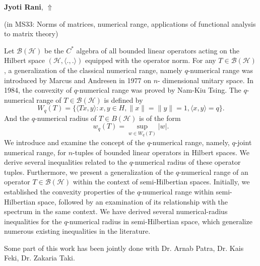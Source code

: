 \documentclass[ILAS2025-program.tex]{subfiles}
\begin{document}
\hypertarget{down0278}{}\begin{ilasabstract}
    
\textbf{Jyoti Rani},  \hfill \hyperlink{up0278}{$\Uparrow$}
    
    
(in {\color{mstitle}MS33: Norms of matrices, numerical range, applications of functional analysis to matrix theory})
        
\mtskip
    Let $\mathcal{B(H)}$ be the $C^*$ algebra of all bounded linear operators acting on the Hilbert space $(\mathcal{H}, \langle .,. \rangle )$ equipped with the operator norm. For any $T \in \mathcal{B(H)}$, 
a generalization of the classical numerical range, namely $q$-numerical range was introduced by Marcus and Andresen in 1977 on $n$- dimensional unitary space. In 1984, the convexity of $q$-numerical range was proved by Nam-Kiu Tsing. The $q$-numerical range of $T \in \mathcal{B}(\mathcal{H})$ is defined by 
\[
W_q(T)=\{ \langle Tx,y \rangle: x,y \in H, \|x\|=\|y\|=1, \langle x,y \rangle=q \}.
\]
		And the $q$-numerical radius of $T \in B(\mathcal{H})$ is of the form
\[
			w_q(T)=\sup_{w \in W_q(T)}|w|.
\]
We introduce and examine the concept of the $q$-numerical range, namely, $q$-joint numerical range, for $n$-tuples of bounded linear operators in Hilbert spaces. We derive several inequalities related to the $q$-numerical radius of these operator tuples. Furthermore, we present a generalization of the $q$-numerical range of an operator $T \in \mathcal{B}(\mathcal{H})$ within the context of semi-Hilbertian spaces. Initially, we established the convexity properties of the $q$-numerical range within semi-Hilbertian space, followed by an examination of its relationship with the spectrum in the same context. We have derived several numerical-radius inequalities for the $q$-numerical radius in semi-Hilbertian space, which generalize numerous existing inequalities in the literature. 

Some part of this work has been jointly done with Dr. Arnab Patra, Dr. Kais Feki, Dr. Zakaria Taki.
\end{ilasabstract}
    
\end{document}
